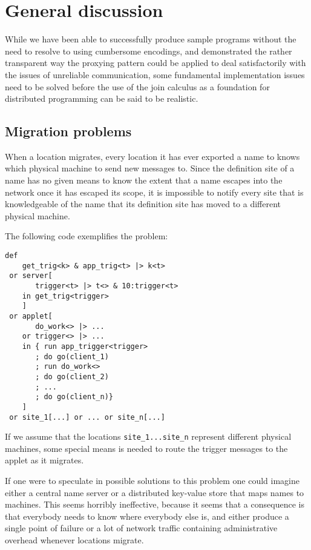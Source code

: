 
\section{General discussion}

While we have been able to successfully produce sample programs without the need
to resolve to using cumbersome encodings, and demonstrated the rather
transparent way the proxying pattern could be applied to deal satisfactorily
with the issues of unreliable communication, some fundamental implementation
issues need to be solved before the use of the join calculus as a foundation for
distributed programming can be said to be realistic.

\subsection*{Migration problems}
When a location migrates, every location it has ever exported a name to knows
which physical machine to send new messages to.  Since the definition site of a
name has no given means to know the extent that a name escapes into the network
once it has escaped its scope, it is impossible to notify every site that is
knowledgeable of the name that its definition site has moved to a different
physical machine.

The following code exemplifies the problem:
\begin{verbatim}
def
    get_trig<k> & app_trig<t> |> k<t>
 or server[
       trigger<t> |> t<> & 10:trigger<t>
    in get_trig<trigger>
    ]
 or applet[
       do_work<> |> ...
    or trigger<> |> ...
    in { run app_trigger<trigger>
       ; do go(client_1)
       ; run do_work<>
       ; do go(client_2)
       ; ...
       ; do go(client_n)}
    ]
 or site_1[...] or ... or site_n[...]
\end{verbatim}

If we assume that the locations \verb+site_1...site_n+ represent different
physical machines, some special means is needed to route the trigger messages to
the applet as it migrates.

\vspace{1em}

If one were to speculate in possible solutions to this problem one could imagine
either a central name server or a distributed key-value store that maps names to
machines. This seems horribly ineffective, because it seems that a consequence
is that everybody needs to know where everybody else is, and either produce a
single point of failure or a lot of network traffic containing administrative
overhead whenever locations migrate.

